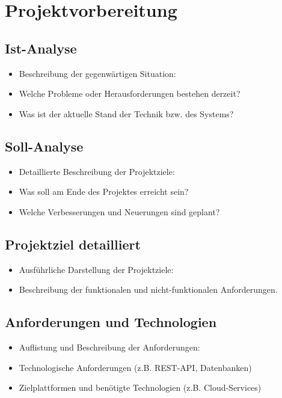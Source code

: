 
\section{Projektvorbereitung}\label{projektvorbereitung}

\subsection{Ist-Analyse}\label{ist-analyse}

\begin{itemize}
\item
  Beschreibung der gegenwärtigen Situation:
\item
  Welche Probleme oder Herausforderungen bestehen derzeit?
\item
  Was ist der aktuelle Stand der Technik bzw. des Systems?
\end{itemize}

\subsection{Soll-Analyse}\label{soll-analyse}

\begin{itemize}
\item
  Detaillierte Beschreibung der Projektziele:
\item
  Was soll am Ende des Projektes erreicht sein?
\item
  Welche Verbesserungen und Neuerungen sind geplant?
\end{itemize}

\subsection{Projektziel detailliert}\label{projektziel-detailliert}

\begin{itemize}
\item
  Ausführliche Darstellung der Projektziele:
\item
  Beschreibung der funktionalen und nicht-funktionalen Anforderungen.
\end{itemize}

\subsection{Anforderungen und Technologien}\label{anforderungen-und-technologien}

\begin{itemize}
\item
  Auflistung und Beschreibung der Anforderungen:
\item
  Technologische Anforderungen (z.B. REST-API, Datenbanken)
\item
  Zielplattformen und benötigte Technologien (z.B. Cloud-Services)
\end{itemize}